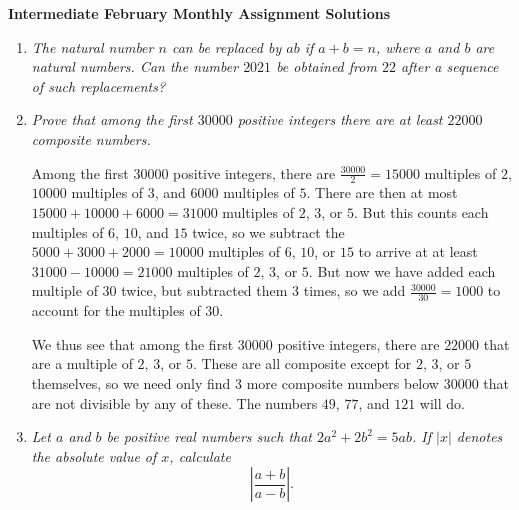 \documentclass{article}
\begin{document}
\thispagestyle{empty}

\begin{center}
  \textbf{\Large Intermediate February Monthly Assignment Solutions}
\end{center}

\vspace{12pt}

\begin{enumerate}[1.]

\vspace{6pt}
\item %
{\itshape The natural number $n$ can be replaced by $ab$ if $a + b = n$, where $a$ and $b$ are natural numbers. Can the number $2021$ be obtained from $22$ after a sequence of such
replacements?}


\vspace{6pt}
\item %
{\itshape Prove that among the first $30000$ positive integers there are at least $22000$ composite numbers.}

Among the first $30000$ positive integers, there are $\frac{30000}{2} = 15000$ multiples of $2$, $10000$ multiples of $3$, and $6000$ multiples of $5$. There are then at most $15000 + 10000 + 6000 = 31000$ multiples of $2$, $3$, or $5$. But this counts each multiples of $6$, $10$, and $15$ twice, so we subtract the $5000 + 3000 + 2000 = 10000$ multiples of $6$, $10$, or $15$ to arrive at at least $31000 - 10000 = 21000$ multiples of $2$, $3$, or $5$. But now we have added each multiple of $30$ twice, but subtracted them $3$ times, so we add $\frac{30000}{30} = 1000$ to account for the multiples of $30$.

We thus see that among the first $30000$ positive integers, there are $22000$ that are a multiple of $2$, $3$, or $5$. These are all composite except for $2$, $3$, or $5$ themselves, so we need only find $3$ more composite numbers below $30000$ that are not divisible by any of these. The numbers $49$, $77$, and $121$ will do.


\vspace{6pt}
\item %
{\itshape Let $a$ and $b$ be positive real numbers such that $2a^2 +2b^2 = 5ab$.
If $|x|$ denotes the absolute value of $x$, calculate
\[ \left|\frac{a+b}{a-b}\right|. \]}



\end{enumerate}
\end{document}

